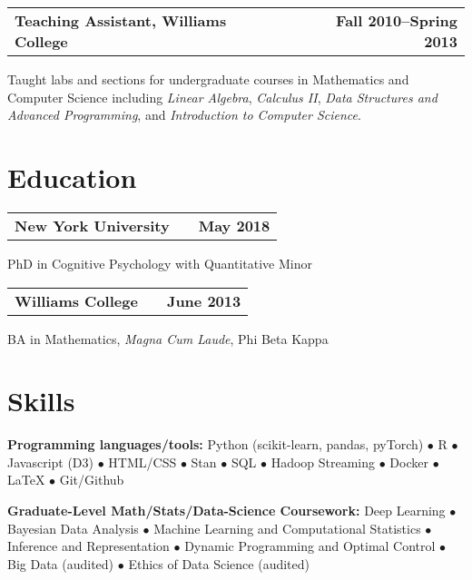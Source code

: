 \documentclass[10pt]{resume}
\begin{document}
\begin{addmargin}[1em]{0em}
\begin{tabular}{@{} L M R}
  \textbf{Teaching Assistant, Williams College}& &\textbf{Fall 2010--Spring 2013}\\
\end{tabular}\vspace{-1em}
  Taught labs and sections for undergraduate courses in Mathematics and Computer Science
  including \emph{Linear Algebra}, \emph{Calculus II}, \emph{Data Structures and Advanced
  Programming}, and \emph{Introduction to Computer Science}.

\end{addmargin}

\section{Education}

\hrulefill

\begin{addmargin}[1em]{0em}

\begin{tabular}{@{} L M R}
  \textbf{New York University}& &\textbf{May 2018}\\
\end{tabular}\vspace{-1em}
  PhD in Cognitive Psychology with Quantitative Minor

\begin{tabular}{@{} L M R}
  \textbf{Williams College}& &\textbf{June 2013}\\
\end{tabular}\vspace{-1em}
  BA in Mathematics, \emph{Magna Cum Laude}, Phi Beta Kappa

\end{addmargin}

\section{Skills}

\hrulefill

\begin{addmargin}[1em]{0em}
\textbf{Programming languages/tools:}
Python (scikit-learn, pandas, pyTorch) $\bullet$ R $\bullet$ Javascript (D3)
$\bullet$ HTML/CSS $\bullet$ Stan $\bullet$ SQL $\bullet$
Hadoop Streaming $\bullet$ Docker $\bullet$ LaTeX $\bullet$ Git/Github

\textbf{Graduate-Level Math/Stats/Data-Science Coursework:}
Deep Learning $\bullet$ Bayesian Data Analysis  $\bullet$ Machine Learning and Computational Statistics $\bullet$ 
Inference and Representation
$\bullet$ Dynamic Programming and Optimal Control $\bullet$
Big Data (audited) $\bullet$ Ethics of Data Science (audited)

\end{addmargin}
\end{document}
